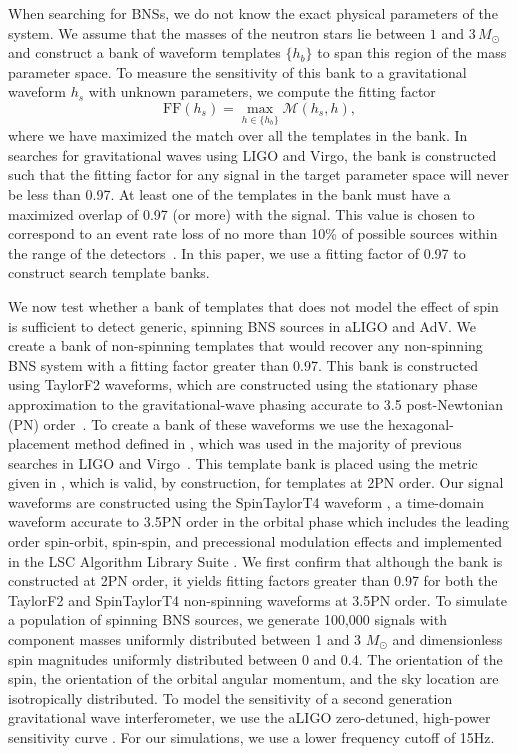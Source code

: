 
When searching for BNSs, we do not know the exact physical parameters of the
system. We assume that the masses of the neutron stars lie between $1$ and
$3\, M_\odot$ and construct a bank of waveform templates $\{h_b\}$ to span this
region of the mass parameter space. To measure the sensitivity of this bank to
a gravitational waveform $h_s$ with unknown parameters, we compute the fitting
factor
\begin{equation}
\textrm{FF}(h_s) = \max_{h \in \{h_b\}} \mathcal{M}(h_s,h),
\end{equation}
where we have maximized the match over all the templates in the bank.  In
searches for gravitational waves using LIGO and Virgo, the bank is constructed
such that the fitting factor for any signal in the target parameter space will
never be less than 0.97. At least one of the templates in the bank must have a
maximized overlap of 0.97 (or more) with the signal. This value is chosen to
correspond to an event rate loss of no more than 10\% of possible sources
within the range of the detectors~\cite{Cutler:1992tc}. In this paper, we use
a fitting factor of 0.97 to construct search template banks.

We now test whether a bank of templates that does not model the effect of spin
is sufficient to detect generic, spinning BNS sources in aLIGO and AdV. We
create a bank of non-spinning templates that would recover any
non-spinning BNS system with a fitting factor greater than 0.97.  This bank is
constructed using TaylorF2 waveforms, which are constructed using the stationary
phase approximation to the gravitational-wave phasing accurate to 3.5
post-Newtonian (PN) order~\cite{DPK99,Blanchet:2006zz}. To create a
bank of these waveforms we use the hexagonal-placement method defined in
\cite{Cokelaer:2007kx}, which was used in the majority of previous searches in
LIGO and Virgo~\cite{Abbott:2009tt,Abbott:2009qj,Abadie:2010yba}. This
template bank is placed using the metric given in \cite{OwenSathyaprakash98},
which is valid, by construction, for templates at 2PN order. 
Our signal waveforms are constructed using the SpinTaylorT4
waveform \cite{BCV03b}, a time-domain waveform accurate to 3.5PN order
in the orbital phase which includes the leading order spin-orbit, spin-spin,
and precessional modulation effects and implemented in the LSC Algorithm Library Suite
\cite{lalsuite}. We first confirm that although the
bank is constructed at 2PN order, it yields fitting factors greater than 0.97
for both the TaylorF2 and SpinTaylorT4 non-spinning waveforms at 3.5PN order.
To simulate a population of spinning BNS sources, we generate 100,000 signals
with component masses uniformly distributed between 1 and 3 $M_{\odot}$ and
dimensionless spin magnitudes uniformly distributed between 0 and 0.4. The orientation
of the spin, the orientation of the orbital angular momentum, and the sky
location are isotropically distributed.  To model the sensitivity of a second
generation gravitational wave interferometer, we use the aLIGO zero-detuned,
high-power sensitivity curve \cite{aLIGOSensCurves}. For our simulations, we
use a lower frequency cutoff of 15Hz.


